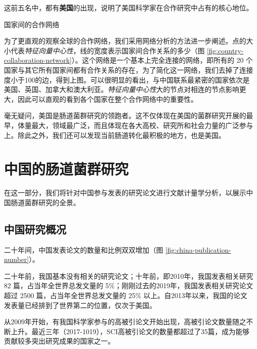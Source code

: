 \documentclass[]{ctexbook}
\begin{document}
这前五名中，都有\textbf{美国}的出现，说明了美国科学家在合作研究中占有的核心地位。

\hypertarget{htmlwidget-8ec7bf5b2dd24834f68c}{}

\label{fig:country-collaboration-network}国家间的合作网络

为了更直观的观察全球的合作网络，我们采用网络分析的方法进一步阐述。点的大小代表\emph{特征向量中心性}，线的宽度表示国家间合作关系的多少（图 \ref{fig:country-collaboration-network}）。这个网络是一个基本上完全连接的网络，即所有的 20 个国家与其它所有国家间都有合作关系的存在，为了简化这一网络，我们去掉了连接度小于100的边，得到上图。可以很明显的看出，与中国联系最紧密的国家依次是美国、英国、加拿大和澳大利亚。\emph{特征向量中心性}大的节点对相连的节点影响更大，因此可以直观的看到各个国家在整个合作网络中的重要性。

毫无疑问，美国是肠道菌群研究的领跑者。这不仅体现在美国的菌群研究开展的最早，体量最大，领域最广泛，而且体现在各大高校、研究所和社会力量的广泛参与上。除此之外，我们还可以发现当前肠道转化最积极的地方，也是美国。

\hypertarget{china-study}{%
\chapter{中国的肠道菌群研究}\label{china-study}}

在这一部分，我们将针对中国参与发表的研究论文进行文献计量学分析，以展示中国肠道菌群研究的全景。

\hypertarget{ux4e2dux56fdux7814ux7a76ux6982ux51b5}{%
\section{中国研究概况}\label{ux4e2dux56fdux7814ux7a76ux6982ux51b5}}

二十年间，中国发表论文的数量和比例双双增加（图 \ref{fig:china-publication-number}）。

二十年前，我国基本没有相关的研究论文；十年前，即2010年，我国发表相关研究 82 篇，占当年全世界总发文量的 5\%；刚刚过去的2019年，我国发表相关研究论文超过 2500 篇，占当年全世界总发文量的 25\% 以上。自2013年以来，我国的论文发表量已经排到了世界第二的位置，仅次于美国。

从2009年开始，有我国科学家参与的高被引论文开始出现，高被引论文数量随之不断上升。最近三年（2017-1019），SCI高被引论文的数量都超过了35篇，成为能够贡献较多突出研究成果的国家之一。
\end{document}
